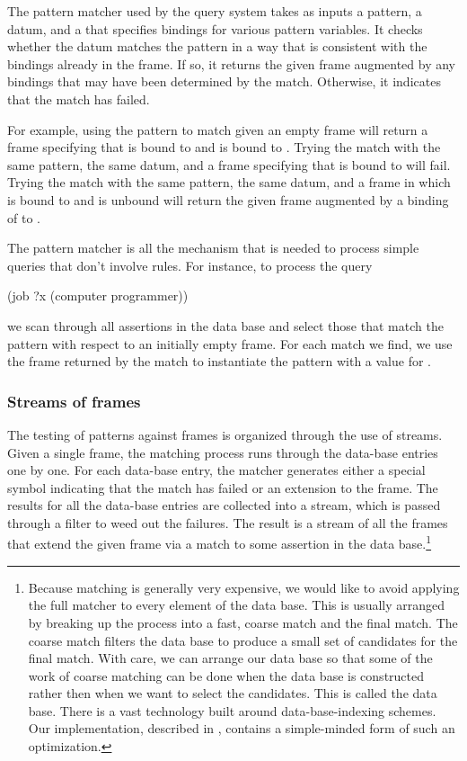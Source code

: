 The pattern matcher used by the query system takes as inputs a pattern, a
datum, and a  that specifies bindings for various pattern
variables.  It checks whether the datum matches the pattern in a way that is
consistent with the bindings already in the frame.  If so, it returns the given
frame augmented by any bindings that may have been determined by the match.
Otherwise, it indicates that the match has failed.

For example, using the pattern  to match  given
an empty frame will return a frame specifying that  is bound to
 and  is bound to .  Trying the match with the same
pattern, the same datum, and a frame specifying that  is bound to
 will fail.  Trying the match with the same pattern, the same datum,
and a frame in which  is bound to  and  is unbound
will return the given frame augmented by a binding of  to .

The pattern matcher is all the mechanism that is needed to process simple
queries that don't involve rules.  For instance, to process the query

\begin{codeBlock}
(job ?x (computer programmer))
\end{codeBlock}

\noindent
we scan through all assertions in the data base and select those that match the
pattern with respect to an initially empty frame.  For each match we find, we
use the frame returned by the match to instantiate the pattern with a value for
.

\subsubsection*{Streams of frames}

The testing of patterns against frames is organized through the use of streams.
Given a single frame, the matching process runs through the data-base entries
one by one.  For each data-base entry, the matcher generates either a special
symbol indicating that the match has failed or an extension to the frame.  The
results for all the data-base entries are collected into a stream, which is
passed through a filter to weed out the failures.  The result is a stream of
all the frames that extend the given frame via a match to some assertion in the
data base.\footnote{Because matching is generally very expensive, we would like
to avoid applying the full matcher to every element of the data base.  This is
usually arranged by breaking up the process into a fast, coarse match and the
final match.  The coarse match filters the data base to produce a small set of
candidates for the final match.  With care, we can arrange our data base so
that some of the work of coarse matching can be done when the data base is
constructed rather then when we want to select the candidates.  This is called
 the data base.  There is a vast technology built around
data-base-indexing schemes.  Our implementation, described in
, contains a simple-minded form of such an optimization.}

